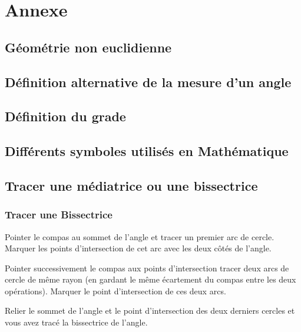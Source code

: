 \documentclass[a4paper, twoside]{article}
\begin{document}

\section{Annexe}

\subsection*{Géométrie non euclidienne} \label{geo_non_euclidienne}

\subsection*{Définition alternative de la mesure d'un angle} \label{autre_def_angle}

\subsection*{Définition du grade} \label{grade}


\subsection*{Différents symboles utilisés en Mathématique} \label{symboles_math}


\subsection*{Tracer une médiatrice ou une bissectrice} \label{tracer_mediatrice_bissectrice}

\subsubsection*{Tracer une Bissectrice}
Pointer le compas au sommet de l'angle et tracer un premier arc de cercle. Marquer les points d'intersection de cet arc avec les deux côtés de l'angle.

Pointer successivement le compas aux points d'intersection tracer deux arcs de cercle de même rayon (en gardant le même écartement du compas entre les deux opérations). Marquer le point d'intersection de ces deux arcs.

Relier le sommet de l'angle et le point d'intersection des deux derniers cercles et vous avez tracé la bissectrice de l'angle.
\end{document}

